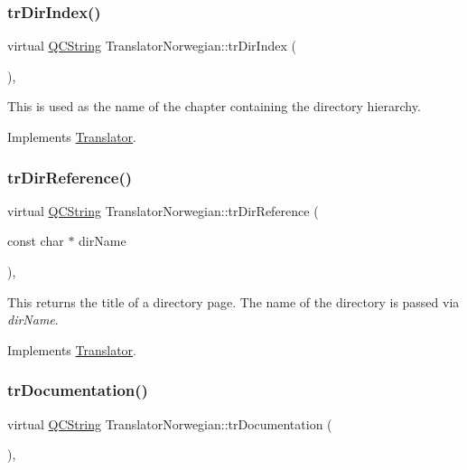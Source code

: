 \subsubsection{\texorpdfstring{trDirIndex()}{trDirIndex()}}
{\footnotesize\ttfamily virtual \mbox{\hyperlink{class_q_c_string}{Q\+C\+String}} Translator\+Norwegian\+::tr\+Dir\+Index (\begin{DoxyParamCaption}{ }\end{DoxyParamCaption})\hspace{0.3cm}{\ttfamily [inline]}, {\ttfamily [virtual]}}

This is used as the name of the chapter containing the directory hierarchy. 

Implements \mbox{\hyperlink{class_translator}{Translator}}.

\mbox{\label{class_translator_norwegian_aaec5ad35b4a4ca35da01d49ec5c2d163}} 
\subsubsection{\texorpdfstring{trDirReference()}{trDirReference()}}
{\footnotesize\ttfamily virtual \mbox{\hyperlink{class_q_c_string}{Q\+C\+String}} Translator\+Norwegian\+::tr\+Dir\+Reference (\begin{DoxyParamCaption}\item[{const char $\ast$}]{dir\+Name }\end{DoxyParamCaption})\hspace{0.3cm}{\ttfamily [inline]}, {\ttfamily [virtual]}}

This returns the title of a directory page. The name of the directory is passed via {\itshape dir\+Name}. 

Implements \mbox{\hyperlink{class_translator}{Translator}}.

\mbox{\label{class_translator_norwegian_aaeef151315b77ece7d99362d620b72f4}} 
\subsubsection{\texorpdfstring{trDocumentation()}{trDocumentation()}}
{\footnotesize\ttfamily virtual \mbox{\hyperlink{class_q_c_string}{Q\+C\+String}} Translator\+Norwegian\+::tr\+Documentation (\begin{DoxyParamCaption}{ }\end{DoxyParamCaption})\hspace{0.3cm}{\ttfamily [inline]}, {\ttfamily [virtual]}}

